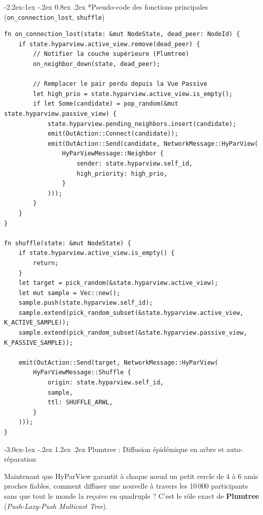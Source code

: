 \documentclass[11pt,a4paper]{article}
\makeatletter
\renewcommand\subsection{\@startsection{subsection}{2}{\z@}%
                                     {-3.0ex\@plus -1ex \@minus -.2ex}%
                                     {1.2ex \@plus .2ex}%
                                     {\normalfont\large\bfseries\color{PrimaryBlue}}}
\renewcommand\subsubsection{\@startsection{subsubsection}{3}{\z@}%
                                     {-2.2ex\@plus -1ex \@minus -.2ex}%
                                     {0.8ex \@plus .2ex}%
                                     {\normalfont\normalsize\bfseries\color{AccentTeal}}}
\makeatother
\begin{document}
\subsubsection*{Pseudo-code des fonctions principales (\texttt{on\_connection\_lost}, \texttt{shuffle})}

\begin{lstlisting}[caption={Gestion de perte de connexion et brassage périodique dans HyParView}]
fn on_connection_lost(state: &mut NodeState, dead_peer: NodeId) {
    if state.hyparview.active_view.remove(dead_peer) {
        // Notifier la couche supérieure (Plumtree)
        on_neighbor_down(state, dead_peer);

        // Remplacer le pair perdu depuis la Vue Passive
        let high_prio = state.hyparview.active_view.is_empty();
        if let Some(candidate) = pop_random(&mut state.hyparview.passive_view) {
            state.hyparview.pending_neighbors.insert(candidate);
            emit(OutAction::Connect(candidate));
            emit(OutAction::Send(candidate, NetworkMessage::HyParView(
                HyParViewMessage::Neighbor {
                    sender: state.hyparview.self_id,
                    high_priority: high_prio,
                }
            )));
        }
    }
}

fn shuffle(state: &mut NodeState) {
    if state.hyparview.active_view.is_empty() {
        return;
    }
    let target = pick_random(&state.hyparview.active_view);
    let mut sample = Vec::new();
    sample.push(state.hyparview.self_id);
    sample.extend(pick_random_subset(&state.hyparview.active_view, K_ACTIVE_SAMPLE));
    sample.extend(pick_random_subset(&state.hyparview.passive_view, K_PASSIVE_SAMPLE));

    emit(OutAction::Send(target, NetworkMessage::HyParView(
        HyParViewMessage::Shuffle {
            origin: state.hyparview.self_id,
            sample,
            ttl: SHUFFLE_ARWL,
        }
    )));
}
\end{lstlisting}

\newpage

\subsection{Plumtree : Diffusion épidémique en arbre et auto-réparation}

Maintenant que HyParView garantit à chaque nœud un petit cercle de 4 à 6 amis proches fiables, comment diffuser une nouvelle à travers les 10\,000 participants sans que tout le monde la reçoive en quadruple ? C'est le rôle exact de \textbf{Plumtree} (\emph{Push-Lazy-Push Multicast Tree}).
\end{document}
